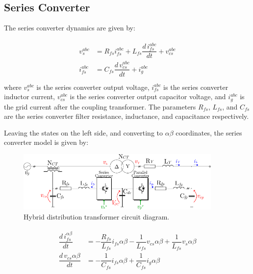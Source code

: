 \subsection{Series Converter}

The series converter dynamics are given by:

\begin{align}
    \begin{aligned}
        v_s^{abc} &= R_{fs}i_{fs}^{abc} + L_{fs}\dfrac{d\,i_{fs}^{abc}}{dt} + v_{cs}^{abc} \\
        i_{fs}^{abc} &= C_{fs}\dfrac{d\,v_{cs}^{abc}}{dt} + i_g^{abc} \\
    \end{aligned}
\end{align}
where $v_s^{abc}$ is the series converter output voltage, $i_{fs}^{abc}$ is the series converter inductor current, $v_{cs}^{abc}$ is the series converter output capacitor voltage, and $i_g^{abc}$ is the grid current after the coupling transformer. The parameters $R_{fs}$, $L_{fs}$, and $C_{fs}$ are the series converter filter resistance, inductance, and capacitance respectively.

Leaving the states on the left side, and converting to $\alpha\beta$ coordinates, the series converter model is given by:

\begin{figure}
    \centering
    \includegraphics[width=0.9\textwidth]{Images/HDT_Diagram.pdf} 
    \caption{Hybrid distribution transformer circuit diagram.}
    \label{fig:HDT_Transformer}
\end{figure}

\begin{align}
    \begin{aligned}
        \dfrac{d\,i_{fs}^{\alpha\beta}}{dt} &= -\dfrac{R_{fs}}{L_{fs}}i_{fs}{\alpha\beta} - \dfrac{1}{L_{fs}}v_{cs}{\alpha\beta} + \dfrac{1}{L_{fs}}v_s{\alpha\beta} \\
        \dfrac{d\,v_{cs}{\alpha\beta}}{dt} &= -\dfrac{1}{C_{fs}}i_{fs}{\alpha\beta} + \dfrac{1}{C_{fs}}i_g{\alpha\beta}
    \end{aligned}
\end{align}

